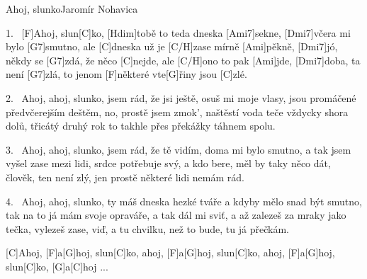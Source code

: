 
\begin{song}{Ahoj, slunko}{Jaromír Nohavica}

\begin{xverse}{1.~}
[\large F]Ahoj, slun[\large C]ko, [\large Hdim]tobě to teda dneska [\large Ami7]sekne,
[\large Dmi7]včera mi bylo [\large G7]smutno, ale [\large C]dneska už je [\large C/H]zase mírně [\large Ami]pěkně,
[\large Dmi7]jó, někdy se [\large G7]zdá, že něco [\large C]nejde, ale [\large C/H]ono to pak [\large Ami]jde,
[\large Dmi7]doba, ta není [\large G7]zlá, to jenom [\large F]některé vte[\large G]{ři}ny jsou [\large C]zlé.
\end{xverse}

\begin{xverse}{2.~}
Ahoj, ahoj, slunko, jsem rád, že jsi ještě,
osuš mi moje vlasy, jsou promáčené předvčerejším deštěm,
no, prostě jsem zmok', naštěstí voda teče vždycky shora dolů,
třicátý druhý rok to takhle přes překážky táhnem spolu.
\end{xverse}

\begin{xverse}{3.~}
Ahoj, ahoj, slunko, jsem rád, že tě vidím,
doma mi bylo smutno, a tak jsem vyšel zase mezi lidi,
srdce potřebuje svý, a kdo bere, měl by taky něco dát,
člověk, ten není zlý, jen prostě některé lidi nemám rád.
\end{xverse}

\begin{xverse}{4.~}
Ahoj, ahoj, slunko, ty máš dneska hezké tváře
a kdyby mělo snad být smutno, tak na to já mám svoje opraváře,
a tak dál mi sviť, a až zalezeš za mraky jako tečka,
vylezeš zase, viď, a tu chvilku, než to bude, tu já přečkám.
\end{xverse}

\begin{xverse}{}
[\large C]Ahoj, [\large F]a[\large G]hoj, slun[\large C]ko, ahoj, [\large F]a[\large G]hoj, slun[\large C]ko,
ahoj, [\large F]a[\large G]hoj, slun[\large C]ko, [\large G]a[\large C]hoj ...
\end{xverse}

\end{song}

